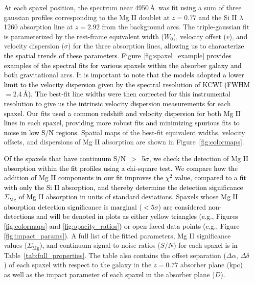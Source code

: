 \documentclass[twocolumn]{aastex62}
\newcommand{\MgII}{Mg\tiny{ }\footnotesize{II}\normalsize{ }}
\newcommand{\SiII}{Si\tiny{ }\footnotesize{II}\normalsize{ }}
\begin{document}
At each spaxel position, the spectrum near 4950\,\AA\ was fit using a sum of three gaussian profiles corresponding to the \MgII doublet at $z=0.77$ and the \SiII $\lambda$1260 absorption line at $z=2.92$ from the background arcs. The triple-gaussian fit is parameterized by the rest-frame equivalent width ($W_0$), velocity offset ($v$), and velocity dispersion ($\sigma$) for the three absorption lines\textcolor{black}{, allowing us to characterize the spatial trends of these parameters. Figure \ref{fig:spaxel_example} provides examples of the spectral fits for various spaxels within the absorber galaxy and both gravitational arcs. It is important to note that the models adopted a lower limit to the velocity dispersion given by the spectral resolution of KCWI (FWHM $= 2.4$\,\AA). The best-fit line widths were then corrected for this instrumental resolution to give us the intrinsic velocity dispersion measurements for each spaxel. Our fits used a common redshift and velocity dispersion for both \MgII lines in each spaxel, providing more robust fits and minimizing spurious fits to noise in low S/N regions.} Spatial maps of the best-fit equivalent widths, velocity offsets, and dispersions of \MgII absorption are shown in Figure~\ref{fig:colormaps}.


\textcolor{black}{Of the spaxels that have continuum S/N~$>$~5$\sigma$, we check the detection of \MgII absorption within the fit profiles using a chi-square test. We compare how the addition of \MgII components in our fit improves the $\chi^2$ value, compared to a fit with only the \SiII absorption, and thereby determine the detection significance $\Sigma_{\text{Mg}}$ of \MgII absorption in units of standard deviations. Spaxels whose \MgII absorption detection significance is marginal ($<5\sigma$) are considered non-detections and will be denoted in plots as either yellow triangles (e.g., Figures \ref{fig:colormaps} and \ref{fig:opacity_ratios}) or open-faced data points (e.g., Figure \ref{fig:impact_params}).} A full list of the fitted parameters, \MgII significance values ($\Sigma_{\text{Mg}}$), and continuum signal-to-noise ratios ($S/N$) for each spaxel is in Table~\ref{tab:full_properties}. The table also contains the offset separation ($\Delta\alpha$, $\Delta\delta$) of each spaxel with respect to the galaxy in the $z=0.77$ absorber plane (kpc) as well as the impact parameter of each spaxel in the absorber plane ($D$).
\end{document}
